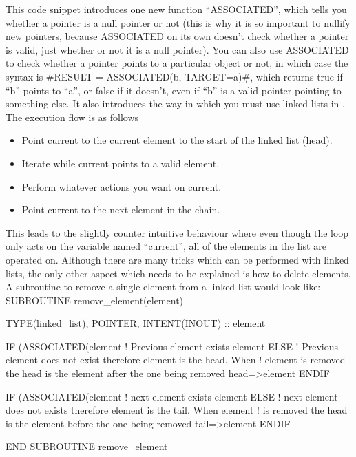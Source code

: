\documentclass[12pt,a4paper]{article}
\newcommand{\EPOCH}{{\color{warwickdark}\fontfamily{phv}\selectfont{EPOCH}}}
\newenvironment{boxverbatim}{\lboxverbatim{none}}{\endlboxverbatim}
\begin{document}
This code snippet introduces one new function ``ASSOCIATED'', which tells you
whether a pointer is a null pointer or not (this is why it is so important to
nullify new pointers, because ASSOCIATED on its own doesn't check whether a
pointer is valid, just whether or not it is a null pointer). You can also use
ASSOCIATED to check whether a pointer points to a particular object or not, in
which case the syntax is #RESULT = ASSOCIATED(b, TARGET=a)#, which
returns true if ``b'' points to ``a'', or false if it doesn't, even if ``b''
is a valid pointer pointing to something else. It also introduces the way in
which you must use linked lists in {\EPOCH}. The execution flow is as follows
\begin{itemize}
\item Point current to the current element to the start of the linked list
  (head).
\item Iterate while current points to a valid element.
\item Perform whatever actions you want on current.
\item Point current to the next element in the chain.
\end{itemize}
This leads to the slightly counter intuitive behaviour where even though the
loop only acts on the variable named ``current'', all of the elements in the
list are operated on. Although there are many tricks which can be performed
with linked lists, the only other aspect which needs to be explained is how
to delete elements. A subroutine to remove a single element from a linked list
would look like:
\begin{boxverbatim}
SUBROUTINE remove_element(element)

  TYPE(linked_list), POINTER, INTENT(INOUT) :: element

  IF (ASSOCIATED(element%
    ! Previous element exists
    element%
  ELSE
    ! Previous element does not exist therefore element is the head. When
    ! element is removed the head is the element after the one being removed
    head=>element%
  ENDIF

  IF (ASSOCIATED(element%
    ! next element exists
    element%
  ELSE
    ! next element does not exists therefore element is the tail. When element
    ! is removed the head is the element before the one being removed
    tail=>element%
  ENDIF

END SUBROUTINE remove_element
\end{boxverbatim}
\end{document}
